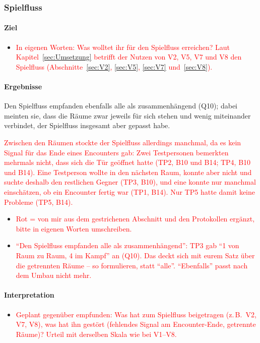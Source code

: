 \documentclass[../Main.tex]{subfiles}
\begin{document}
\subsubsection{Spielfluss}

\paragraph{Ziel}
\begin{itemize}[leftmargin=1.5cm]
    \item \textcolor{red}{In eigenen Worten: Was wolltet ihr für den Spielfluss erreichen? Laut Kapitel~\ref{sec:Umsetzung} betrifft der Nutzen von V2, V5, V7 und V8 den Spielfluss (Abschnitte~\ref{sec:V2}, \ref{sec:V5}, \ref{sec:V7} und~\ref{sec:V8}).}
\end{itemize}

\paragraph{Ergebnisse}
Den Spielfluss empfanden ebenfalls alle als zusammenhängend (Q10); dabei meinten sie, dass die Räume zwar jeweils für sich stehen und wenig miteinander verbindet, der Spielfluss insgesamt aber gepasst habe.

\textcolor{red}{Zwischen den Räumen stockte der Spielfluss allerdings manchmal, da es kein Signal für das Ende eines Encounters gab: Zwei Testpersonen bemerkten mehrmals nicht, dass sich die Tür geöffnet hatte (TP2, B10 und B14; TP4, B10 und B14). Eine Testperson wollte in den nächsten Raum, konnte aber nicht und suchte deshalb den restlichen Gegner (TP3, B10), und eine konnte nur manchmal einschätzen, ob ein Encounter fertig war (TP1, B14). Nur TP5 hatte damit keine Probleme (TP5, B14).}

\begin{itemize}[leftmargin=1.5cm]
    \item \textcolor{red}{Rot = von mir aus dem gestrichenen Abschnitt und den Protokollen ergänzt, bitte in eigenen Worten umschreiben.}
    \item \textcolor{red}{\enquote{Den Spielfluss empfanden alle als zusammenhängend}: TP3 gab \enquote{1 von Raum zu Raum, 4 im Kampf} an (Q10). Das deckt sich mit eurem Satz über die getrennten Räume -- so formulieren, statt \enquote{alle}. \enquote{Ebenfalls} passt nach dem Umbau nicht mehr.}
\end{itemize}

\paragraph{Interpretation}
\begin{itemize}[leftmargin=1.5cm]
    \item \textcolor{red}{Geplant gegenüber empfunden: Was hat zum Spielfluss beigetragen (z.\,B.\ V2, V7, V8), was hat ihn gestört (fehlendes Signal am Encounter-Ende, getrennte Räume)? Urteil mit derselben Skala wie bei V1--V8.}
\end{itemize}
\end{document}
